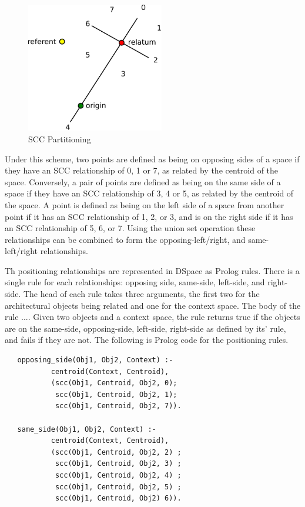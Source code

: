 \documentclass[12pt]{ucthesis}
\begin{document}
\begin{figure}[H]
\centering
\includegraphics[width=60mm]{scc}
\caption{SCC Partitioning}
\label{scc}
\end{figure}

Under this scheme, two points are defined as being on opposing sides of a space if they have an SCC relationship of 0, 1 or 7, as related by the centroid of the space. Conversely, a pair of points are defined as being on the same side of a space if they have an SCC relationship of 3, 4 or 5, as related by the centroid of the  space. A point is defined as being on the left side of a space from another point if it has an SCC relationship of 1, 2, or 3, and is on the right side if it has an SCC relationship of 5, 6, or 7. Using the union set operation these relationships can be combined to form the opposing-left/right, and same-left/right relationships.

Th positioning relationships are represented in DSpace as Prolog rules. There is a single rule for each relationships: opposing side, same-side, left-side, and right-side. The head of each rule takes three arguments, the first two for the architectural objects being related and one for the context space. The body of the rule .... Given two objects and a context space, the rule returns true if the objects are on the same-side, opposing-side, left-side, right-side as defined by its' rule, and fails if they are not. The following is Prolog code for the positioning rules.

\begin{verbatim}
   opposing_side(Obj1, Obj2, Context) :- 
           centroid(Context, Centroid),
           (scc(Obj1, Centroid, Obj2, 0);
            scc(Obj1, Centroid, Obj2, 1);
            scc(Obj1, Centroid, Obj2, 7)).
                                          
   same_side(Obj1, Obj2, Context) :- 
           centroid(Context, Centroid),
           (scc(Obj1, Centroid, Obj2, 2) ;
            scc(Obj1, Centroid, Obj2, 3) ;
            scc(Obj1, Centroid, Obj2, 4) ;
            scc(Obj1, Centroid, Obj2, 5) ;
            scc(Obj1, Centroid, Obj2) 6)).   

\end{verbatim}
\end{document}
